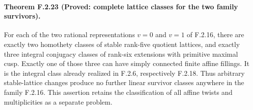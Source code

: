 \paragraph{Theorem F.2.23 (Proved: complete lattice classes for the two family survivors).}
For each of the two rational representations $v=0$ and $v=1$
of F.2.16, there are exactly two homothety classes of stable
rank-five quotient lattices, and exactly three integral
conjugacy classes of rank-six extensions with primitive
maximal cusp.  Exactly one of those three can have simply
connected finite affine fillings.  It is the integral class
already realized in F.2.6, respectively F.2.18.
Thus arbitrary stable-lattice changes produce no further
linear survivor classes anywhere in the family F.2.16.
This assertion retains the classification of all affine
twists and multiplicities as a separate problem.

